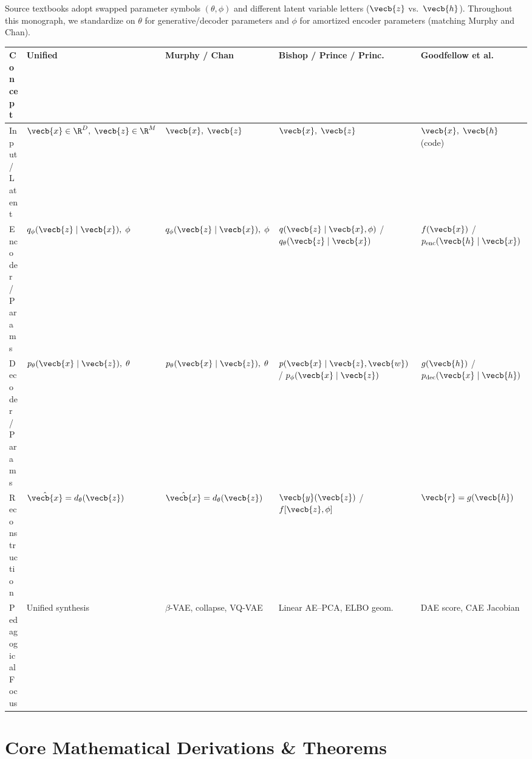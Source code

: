 \documentclass[../../../../master.tex]{subfiles}
\begin{document}
\begin{crossbook}\label{tab:vae:notation}
Source textbooks adopt swapped parameter symbols $(\theta, \phi)$ and different latent variable letters ($\vecb{z}$ vs.\ $\vecb{h}$). Throughout this monograph, we standardize on $\theta$ for generative/decoder parameters and $\phi$ for amortized encoder parameters (matching Murphy and Chan).
\vspace{4pt}
\begin{center}
\footnotesize
\begin{tabularx}{\linewidth}{@{}>{\raggedright\arraybackslash}p{2.3cm} >{\raggedright\arraybackslash}p{2.5cm} >{\raggedright\arraybackslash}p{2.5cm} >{\raggedright\arraybackslash}p{3.0cm} >{\raggedright\arraybackslash}X@{}}
\toprule
\textbf{Concept} & \textbf{Unified} & \textbf{Murphy / Chan} & \textbf{Bishop / Prince / Princ.} & \textbf{Goodfellow et al.} \\
\midrule
Input / Latent & $\vecb{x} \in \R^D,\; \vecb{z} \in \R^M$ & $\vecb{x},\; \vecb{z}$ & $\vecb{x},\; \vecb{z}$ & $\vecb{x},\; \vecb{h}$ (code) \\
Encoder / Params & $q_\phi(\vecb{z}\mid\vecb{x}),\; \phi$ & $q_\phi(\vecb{z}\mid\vecb{x}),\; \phi$ & $q(\vecb{z}\mid\vecb{x},\phi)$ / $q_\theta(\vecb{z}\mid\vecb{x})$ & $f(\vecb{x})$ / $p_{\mathrm{enc}}(\vecb{h}\mid\vecb{x})$ \\
Decoder / Params & $p_\theta(\vecb{x}\mid\vecb{z}),\; \theta$ & $p_\theta(\vecb{x}\mid\vecb{z}),\; \theta$ & $p(\vecb{x}\mid\vecb{z},\vecb{w})$ / $p_\phi(\vecb{x}\mid\vecb{z})$ & $g(\vecb{h})$ / $p_{\mathrm{dec}}(\vecb{x}\mid\vecb{h})$ \\
Reconstruction & $\hat{\vecb{x}} = d_\theta(\vecb{z})$ & $\hat{\vecb{x}} = d_\theta(\vecb{z})$ & $\vecb{y}(\vecb{z})$ / $f[\vecb{z},\phi]$ & $\vecb{r} = g(\vecb{h})$ \\
Pedagogical Focus & Unified synthesis & $\beta$-VAE, collapse, VQ-VAE & Linear AE--PCA, ELBO geom. & DAE score, CAE Jacobian \\
\bottomrule
\end{tabularx}
\end{center}
\end{crossbook}

\section{Core Mathematical Derivations \& Theorems}\label{sec:vae:derivations}
\end{document}
